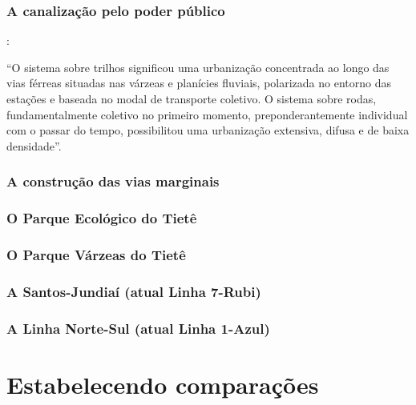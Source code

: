 \documentclass[
article,			%
11pt,				%
oneside,			%
a4paper,			%
english,			%
brazil,				%
sumario=tradicional
]{abntex2}
\begin{document}
	\subsubsection{A canalização pelo poder público} \label{s3:canalizacaopub}
	
	:
	
	\begin{citacao}
		``O sistema sobre trilhos significou uma urbanização concentrada ao longo das vias férreas situadas nas várzeas e planícies fluviais, polarizada no entorno das estações e baseada no modal de transporte coletivo. O sistema sobre rodas, fundamentalmente coletivo no primeiro momento, preponderantemente individual com o passar do tempo, possibilitou uma urbanização extensiva, difusa e de baixa densidade''.
	\end{citacao}
	
	\subsubsection{A construção das vias marginais} \label{s3:marginaltiete}
	
	\subsubsection{O Parque Ecológico do Tietê} \label{s3:pet}
	
	\subsubsection{O Parque Várzeas do Tietê} \label{s3:pvt}
	
	\subsubsection{A Santos-Jundiaí (atual Linha 7-Rubi)} \label{s3:efsj}
	
	\subsubsection{A Linha Norte-Sul (atual Linha 1-Azul)} \label{s3:nortesul}
	
	
	\section{Estabelecendo comparações} \label{s1:comparando}
	
\end{document}
